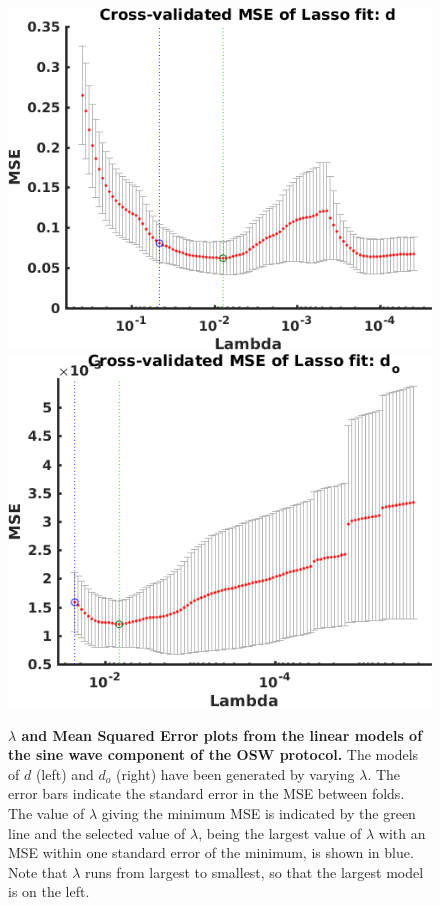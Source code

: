 \documentclass[11pt,a4paper,oneside]{article}
\begin{document}
\begin{figure}[hb]
\begin{center}
\includegraphics[scale=0.42]{Figures/LASSO_OSW_AP_full_lambda_d.png}
\includegraphics[scale=0.42]{Figures/LASSO_OSW_AP_full_lambda_od.png}
\caption{\textbf{$\lambda$ and Mean Squared Error plots from the linear models of the sine wave component of the OSW protocol.} The models of $d$ (left) and $d_o$ (right) have been generated by varying $\lambda$. The error bars indicate the standard error in the MSE between folds. The value of $\lambda$ giving the minimum MSE is indicated by the green line and the selected value of $\lambda$, being the largest value of $\lambda$ with an MSE within one standard error of the minimum, is shown in blue. Note that $\lambda$ runs from largest to smallest, so that the largest model is on the left.}
\label{Fig_LASSO_OSW_AP_core_lambda}
\end{center}
\end{figure}
\end{document}
